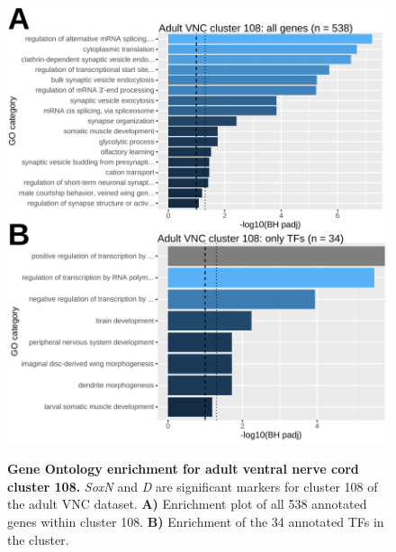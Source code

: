 \documentclass[withindex,glossary]{cam-thesis}
\begin{document}
\setcounter{figure}{21-1}
\begin{figure}[htb]
\centering
\includegraphics[width=\dimexpr.75\textwidth\relax,keepaspectratio]{figs/Fig21 allen cluster108_TFs.pdf}
\label{fig21}
\caption{\textbf{Gene Ontology enrichment for adult ventral nerve cord cluster 108.} \emph{SoxN} and \emph{D} are significant markers for cluster 108 of the adult VNC dataset. \textbf{A)} Enrichment plot of all 538 annotated genes within cluster 108. \textbf{B)} Enrichment of the 34 annotated TFs in the cluster.}
\end{figure}
\end{document}
